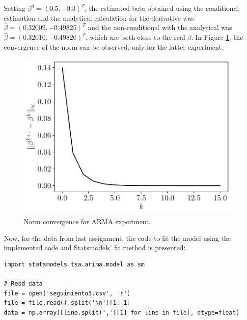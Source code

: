\documentclass[fleqn]{article}
\begin{document}
\begin{enumerate}
Setting $\beta^0=(0.5, -0.3)^T$, the estimated beta obtained using the conditional estimation and the analytical calculation for the derivative was $\hat{\beta}=(0.32009,-0.49825)^T$ and the non-conditional with the analytical was $\hat{\beta}=(0.32010, -0.49820)^T$, which are both close to the real $\beta$. In Figure \ref{fig:exp}, the convergence of the norm can be observed, only for the latter experiment.
\begin{figure}[H]
    \centering
    \includegraphics[scale=0.5]{figs/test.pdf}
    \caption{Norm convergence for ARMA experiment.}
    \label{fig:exp}
\end{figure}

Now, for the data from last assignment, the code to fit the model using the implemented code and Statsmodels' fit method is presented:
\begin{verbatim}
import statsmodels.tsa.arima.model as sm

# Read data
file = open('seguimiento5.csv', 'r')
file = file.read().split('\n')[1:-1]
data = np.array([line.split(',')[1] for line in file], dtype=float)


\end{verbatim}
\end{enumerate}
\end{document}
